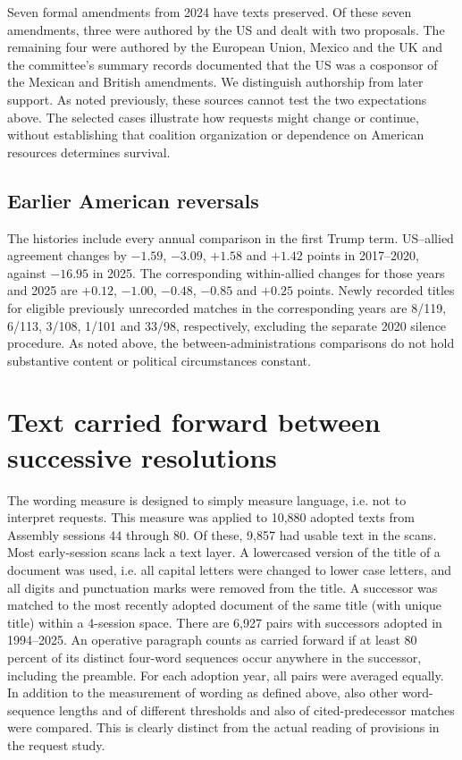 \documentclass[10pt,authoryear]{elsarticle}
\begin{document}
Seven formal amendments from 2024 have texts preserved. Of these seven amendments, three were authored by the US and dealt with two proposals. The remaining four were authored by the European Union, Mexico and the UK and the committee’s summary records documented that the US was a cosponsor of the Mexican and British amendments. We distinguish authorship from later support. As noted previously, these sources cannot test the two expectations above. The selected cases illustrate how requests might change or continue, without establishing that coalition organization or dependence on American resources determines survival.

\subsection{Earlier American reversals}

The histories include every annual comparison in the first Trump term. US--allied agreement changes by $-1.59$, $-3.09$, $+1.58$ and $+1.42$ points in 2017--2020, against $-16.95$ in 2025. The corresponding within-allied changes for those years and 2025 are $+0.12$, $-1.00$, $-0.48$, $-0.85$ and $+0.25$ points. Newly recorded titles for eligible previously unrecorded matches in the corresponding years are 8/119, 6/113, 3/108, 1/101 and 33/98, respectively, excluding the separate 2020 silence procedure. As noted above, the between-administrations comparisons do not hold substantive content or political circumstances constant.

\section{Text carried forward between successive resolutions}
\label{sec:text_reuse}

The wording measure is designed to simply measure language, i.e. not to interpret requests. This measure was applied to 10,880 adopted texts from Assembly sessions 44 through 80. Of these, 9,857 had usable text in the scans. Most early-session scans lack a text layer. A lowercased version of the title of a document was used, i.e. all capital letters were changed to lower case letters, and all digits and punctuation marks were removed from the title. A successor was matched to the most recently adopted document of the same title (with unique title) within a 4-session space. There are 6,927 pairs with successors adopted in 1994--2025. An operative paragraph counts as carried forward if at least 80 percent of its distinct four-word sequences occur anywhere in the successor, including the preamble. For each adoption year, all pairs were averaged equally. In addition to the measurement of wording as defined above, also other word-sequence lengths and of different thresholds and also of cited-predecessor matches were compared. This is clearly distinct from the actual reading of provisions in the request study.
\end{document}
